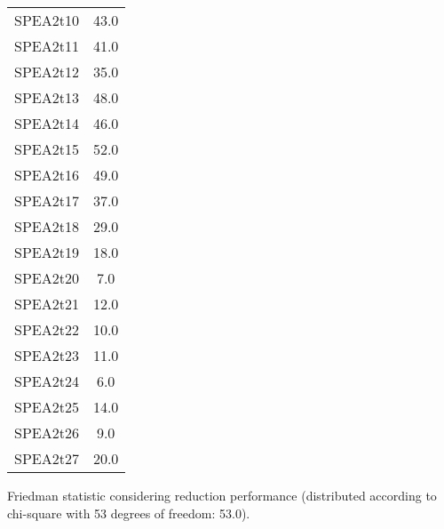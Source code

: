 \documentclass{article}
\begin{document}
\begin{table}[!htp]
\begin{tabular}{c|c}
SPEA2t10&43.0\\
SPEA2t11&41.0\\
SPEA2t12&35.0\\
SPEA2t13&48.0\\
SPEA2t14&46.0\\
SPEA2t15&52.0\\
SPEA2t16&49.0\\
SPEA2t17&37.0\\
SPEA2t18&29.0\\
SPEA2t19&18.0\\
SPEA2t20&7.0\\
SPEA2t21&12.0\\
SPEA2t22&10.0\\
SPEA2t23&11.0\\
SPEA2t24&6.0\\
SPEA2t25&14.0\\
SPEA2t26&9.0\\
SPEA2t27&20.0\\
\end{tabular}
\end{table}


Friedman statistic considering reduction performance (distributed according to chi-square with 53 degrees of freedom: 53.0).
\end{document}
